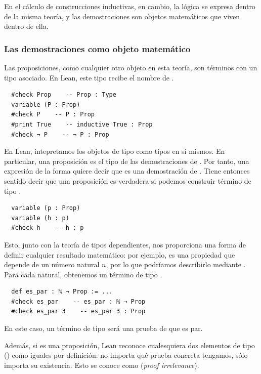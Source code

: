 En el cálculo de construcciones inductivas, en cambio, la lógica se expresa dentro de la misma teoría, y las demostraciones son objetos matemáticos que viven dentro de ella.

\newpage

\subsubsection{Las demostraciones como objeto matemático}

Las proposiciones, como cualquier otro objeto en esta teoría, son términos con un tipo asociado. En Lean, este tipo recibe el nombre de .

\begin{lstlisting}
  #check Prop    -- Prop : Type
  variable (P : Prop)
  #check P    -- P : Prop
  #print True    -- inductive True : Prop
  #check ¬ P    -- ¬ P : Prop
\end{lstlisting}

En Lean, intepretamos los objetos de tipo  como tipos en sí mismos. En particular, una proposición  es el tipo de las demostraciones de . Por tanto, una expresión de la forma  quiere decir que  es una demostración de . Tiene entonces sentido decir que una proposición  es verdadera si podemos construir término de tipo .

\begin{lstlisting}
  variable (p : Prop)
  variable (h : p)
  #check h    -- h : p
\end{lstlisting}

Esto, junto con la teoría de tipos dependientes, nos proporciona una forma de definir cualquier resultado matemático: por ejemplo,  es una propiedad que depende de un número natural $n$, por lo que podríamos describirlo mediante . Para cada  natural, obtenemos un término de tipo .

\begin{lstlisting}
  def es_par : ℕ → Prop := ...
  #check es_par    -- es_par : ℕ → Prop
  #check es_par 3    -- es_par 3 : Prop
\end{lstlisting}

En este caso, un término de tipo  será una prueba de que  es par.

Además, si  es una proposición, Lean reconoce cualesquiera dos elementos de tipo  () como iguales por definición: no importa qué prueba concreta tengamos, sólo importa su existencia. Esto se conoce como  (\textit{proof irrelevance}).

